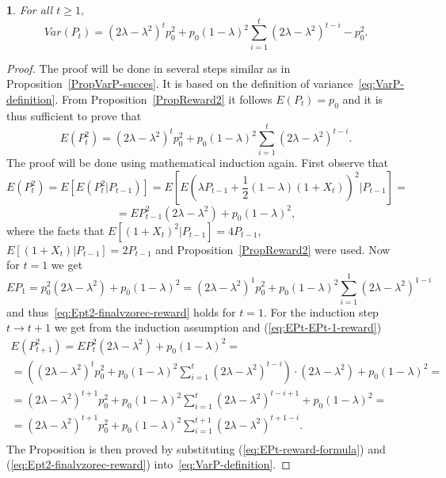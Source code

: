 \documentclass{amsart}
\theoremstyle{definition}
\theoremstyle{plain}
\newtheorem{prop}[thm]{\protect\propositionname}
\theoremstyle{plain}
\theoremstyle{plain}
\numberwithin{equation}{section}
\providecommand{\propositionname}{Proposition}
\begin{document}
    \begin{prop}
        For all $t\geq1,$
        \begin{equation}
            Var(P_{t})=(2\lambda-\lambda^{2})^{t}p_{0}^{2}+p_{0}(1-\lambda)^{2}\sum_{i=1}^{t}(2\lambda-\lambda^{2})^{t-i}-p_{0}^{2}.\label{eq:VarPt-reward-prop}
        \end{equation}
    \end{prop}
    \begin{proof}
        The proof will be done in several steps similar as in Proposition~\ref{PropVarP-succes}.
        It is based on the definition of variance~\eqref{eq:VarP-definition}.
        From Proposition~\ref{PropReward2} it follows $E(P_{t})=p_{0}$ and
        it is thus sufficient to prove that
        \begin{equation}
            E(P_{t}^{2})=(2\lambda-\lambda^{2})^{t}p_{0}^{2}+p_{0}(1-\lambda)^{2}\sum_{i=1}^{t}(2\lambda-\lambda^{2})^{t-i}.\label{eq:Ept2-finalvzorec-reward}
        \end{equation}
        The proof will be done using mathematical induction again.
        First observe that
        \[
            E(P_{t}^{2})=E[E(P_{t}^{2}|P_{t-1})]=E\left[E\left(\lambda P_{t-1}+\frac{1}{2}(1-\lambda)(1+X_{t})\right)^{2}|P_{t-1}\right]=
        \]
        \begin{equation}
            =EP_{t-1}^{2}(2\lambda-\lambda^{2})+p_{0}(1-\lambda)^{2},\label{eq:EPt-EPt-1-reward}
        \end{equation}
        where the facts that $E[(1+X_{t})^{2}|P_{t-1}]=4P_{t-1}$, $E[(1+X_{t})|P_{t-1}]=2P_{t-1}$
        and Proposition~\ref{PropReward2} were used.
        Now for $t=1$ we get
        \[
            EP_{1}=p_{0}^{2}(2\lambda-\lambda^{2})+p_{0}(1-\lambda)^{2}=(2\lambda-\lambda^{2})^{1}p_{0}^{2}+p_{0}(1-\lambda)^{2}\sum_{i=1}^{1}(2\lambda-\lambda^{2})^{1-i}
        \]
        and thus~\eqref{eq:Ept2-finalvzorec-reward} holds for $t=1$.
        For the induction step $t\rightarrow t+1$
        we get from the induction assumption and (\ref{eq:EPt-EPt-1-reward})
        \begin{gather*}
            E(P_{t+1}^{2})=EP_{t}^{2}(2\lambda-\lambda^{2})+p_{0}(1-\lambda)^{2}=\\
            =((2\lambda-\lambda^{2})^{t}p_{0}^{2}+p_{0}(1-\lambda)^{2}\sum_{i=1}^{t}(2\lambda-\lambda^{2})^{t-i})\cdot(2\lambda-\lambda^{2})+p_{0}(1-\lambda)^{2}=\\
            =(2\lambda-\lambda^{2})^{t+1}p_{0}^{2}+p_{0}(1-\lambda)^{2}\sum_{i=1}^{t}(2\lambda-\lambda^{2})^{t-i+1}+p_{0}(1-\lambda)^{2}=\\
            =(2\lambda-\lambda^{2})^{t+1}p_{0}^{2}+p_{0}(1-\lambda)^{2}\sum_{i=1}^{t+1}(2\lambda-\lambda^{2})^{t+1-i}.\\
        \end{gather*}
        The Proposition is then proved by substituting (\ref{eq:EPt-reward-formula})
        and (\ref{eq:Ept2-finalvzorec-reward}) into~\eqref{eq:VarP-definition}.
    \end{proof}
\end{document}
